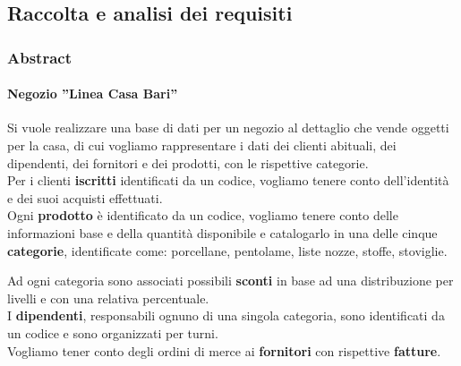 \subsection{Raccolta e analisi dei requisiti}
\subsubsection{Abstract}
\paragraph*{Negozio ''Linea Casa Bari''}
Si vuole realizzare una base di dati per un negozio al dettaglio che vende oggetti per la casa, di cui vogliamo rappresentare i dati dei clienti abituali, dei dipendenti, dei fornitori e dei prodotti, con le rispettive categorie. \\

Per i clienti \textbf{iscritti} identificati da un codice, vogliamo tenere conto dell'identit\`a e dei suoi acquisti effettuati. \\

Ogni \textbf{prodotto} \`e identificato da un codice, vogliamo tenere conto delle informazioni base e della quantit\`a disponibile e catalogarlo in una delle cinque \textbf{categorie}, identificate come: porcellane, pentolame, liste nozze, stoffe, stoviglie. \newline

Ad ogni categoria sono associati possibili \textbf{sconti} in base ad una distribuzione per livelli e con una relativa percentuale. \\

I \textbf{dipendenti}, responsabili ognuno di una singola categoria, sono identificati da un codice e sono organizzati per turni. \\

Vogliamo tener conto degli ordini di merce ai \textbf{fornitori} con rispettive \textbf{fatture}. \\



